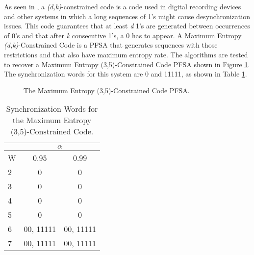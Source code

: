 {As seen in \cite{immink.98}, a \textit{(d,k)}-constrained code is a code used in digital recording devices and other systems in which a long sequences of 1's might cause desynchronization issues. This code guarantees that at least \textit{d} 1's are generated between occurrences of 0's and that after \textit{k} consecutive 1's, a 0 has to appear. A Maximum Entropy \textit{(d,k)}-Constrained Code is a PFSA that generates sequences with those restrictions and that also have maximum entropy rate. The algorithms are tested to recover a Maximum Entropy (3,5)-Constrained Code PFSA shown in Figure \ref{fig:dk_35}. The synchronization words for this system are 0 and 11111, as shown in Table \ref{tab:dk35synch}.

\begin{figure}
\centering
{}
\caption{The Maximum Entropy (3,5)-Constrained Code PFSA.\label{fig:dk_35}}
\end{figure}

\begin{table}
\centering
\caption{Synchronization Words for the Maximum Entropy (3,5)-Constrained Code. \label{tab:dk35synch}}
\begin{tabular}{|l|c|c|}
\hline
 & \multicolumn{2}{c|}{\textbf{$\alpha$}}\\
 \hline
W & 0.95 & 0.99 \\
\hline
2 & 0 & 0 \\ 
3 & 0 & 0 \\ 
4 & 0 & 0 \\ 
5 & 0  & 0 \\
6 & 00, 11111  & 00, 11111 \\
7 & 00, 11111  & 00, 11111 \\
 \hline
\end{tabular}
\end{table}

}
